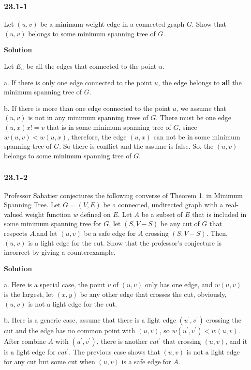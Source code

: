 \subsubsection {23.1-1}

Let $(u, v)$ be a minimum-weight edge in a connected graph $G$. Show that
$(u, v)$ belongs to some minimum spanning tree of $G$.

\textbf{Solution}

Let $E_u$ be all the edges that connected to the point $u$.

a. If there is only one edge connected to the point $u$, the edge belongs to
\textbf{all} the minimum spanning tree of $G$.

b. If there is more than one edge connected to the point $u$, we assume that
{\color{red} $(u, v)$ is not in any minimum spanning trees of $G$}. There must
be one edge $(u, x) { x != v}$ that is in some minimum spanning tree of $G$,
since $w(u, v) < w(u, x)$, therefore, the edge $(u, x)$ can not be in some
minimum spanning tree of $G$. So there is conflict and the assume is false. So,
the $(u, v)$ belongs to some minimum spanning tree of $G$.

\subsubsection {23.1-2}

Professor Sabatier conjectures the following converse of Theorem 1. in Minimum
Spanning Tree. Let $G = (V, E)$ be a connected, undirected graph with a
real-valued weight function $w$ defined on $E$. Let $A$ be a subset of $E$ that
is included in some minimum spanning tree for $G$, let $(S, V - S)$ be any cut
of $G$ that respects $A$,and let $(u, v)$ be a safe edge for $A$ crossing
$(S, V - S)$. Then, $(u, v)$ is a light edge for the cut. Show that the
professor’s conjecture is incorrect by giving a counterexample.

\textbf{Solution}

a. Here is a special case, the point $v$ of $(u, v)$ only has one edge, and
$w(u, v)$ is the largest, let $(x, y)$ be any other edge that crosses the cut,
obviously, $(u, v)$ is not a light edge for the cut.

b. Here is a generic case, assume that there is a light edge $(u^{'}, v^{'})$
crossing the cut and the edge has no common point with $(u, v)$, so
$w(u^{'}, v^{'}) < w(u, v)$. After combine $A$ with $(u^{'}, v^{'})$, there is
another $cut^{'}$ that crossing $(u, v)$, and it is a light edge for $cut^{'}$.
The previous case shows that $(u, v)$ is not a light edge for any cut but some
cut when $(u, v)$ is a safe edge for $A$.

